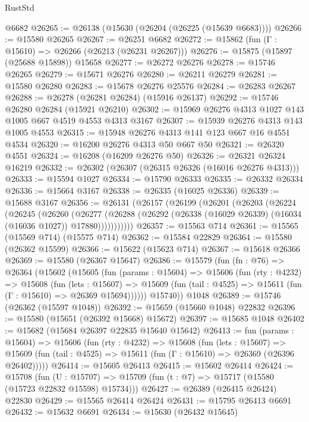 \begin{lexlean}{RustStd}
\begin{coremodule}
    @6682
@26265 := @26138 (@15630 (@26204 (@26225 (@15639 @6683))))
@26266 := @15580 @26265
@26267 := @26251 @6682
@26272 := @15862 (fun (Γ : @15610) => @26266 (@26213 (@26231 @26267)))
@26276 := @15875 (@15897 (@25688 @15898)) @15658
@26277 := @26272 @26276
@26278 := @15746 @26265
@26279 := @15671 @26276
@26280 := @26211 @26279
@26281 := @15580 @26280
@26283 := @15678 @26276 @25576
@26284 := @26283 @26267
@26288 := @26278 (@26281 @26284) (@15916 @26137)
@26292 := @15746 @26280 @26284 (@15921 @26210)
@26302 := @15969 @26276 @4313 @1027 @143 @1005 @667 @4519 @4553 @4313 @3167
@26307 := @15939 @26276 @4313 @143 @1005 @4553
@26315 := @15948 @26276 @4313 @141 @123 @667 @16 @4551 @4534
@26320 := @16200 @26276 @4313 @50 @667 @50
@26321 := @26320 @4551
@26324 := @16208 (@16209 @26276 @50)
@26326 := @26321 @26324 @16219
@26332 := @26302 (@26307 (@26315 @26326 (@16016 @26276 @4313)))
@26333 := @15594 @1027
@26334 := @15790 @26333
@26335 := @26332 @26334
@26336 := @15664 @3167
@26338 := @26335 (@16025 @26336)
@26339 := @15688 @3167
@26356 := @26131
    (@26157
      (@26199
        (@26201
          (@26203
            (@26224
              (@26245
                (@26260
                  (@26277
                    (@26288
                      (@26292 (@26338 (@16029 @26339) (@16034 (@16036 @1027)) @17880)))))))))))
@26357 := @15563 @714
@26361 := @15565 (@15569 @714) (@15575 @714)
@26362 := @15584 @22829
@26364 := @15580 (@26362 @15599)
@26366 := @15622 (@15623 @714)
@26367 := @15618 @26366
@26369 := @15580 (@26367 @15647)
@26386 := @15579
    (fun (fn : @76) =>
    @26364
      (@15602
        (@15605
          (fun (params : @15604) =>
          @15606
            (fun (rty : @4232) =>
            @15608
              (fun (lets : @15607) =>
              @15609 (fun (tail : @4525) => @15611 (fun (Γ : @15610) => @26369 @15694))))))
        @15740))
    @1048
@26389 := @15746 (@26362 (@15597 @1048))
@26392 := @15659 (@15660 @1048) @22832
@26396 := @15580 (@15651 (@26392 @15668) @15672)
@26397 := @15685 @1048
@26402 := @15682 (@15684 @26397 @22835 @15640 @15642)
@26413 := fun (params : @15604) =>
  @15606
    (fun (rty : @4232) =>
    @15608
      (fun (lets : @15607) =>
      @15609 (fun (tail : @4525) => @15611 (fun (Γ : @15610) => @26369 (@26396 @26402)))))
@26414 := @15605 @26413
@26415 := @15602 @26414
@26424 := @15708
    (fun (U : @15707) => @15709 (fun (t : @7) => @15717 (@15580 (@15723 @22832 @15598) @15734)))
@26427 := @26389 (@26415 @26424) @22830
@26429 := @15565 @26414 @26424
@26431 := @15795 @26413 @6691
@26432 := @15632 @6691
@26434 := @15630 (@26432 @15645)

\end{coremodule}
\end{lexlean}
